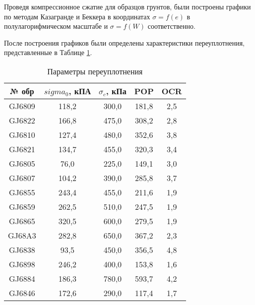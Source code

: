 Проведя компрессионное сжатие для образцов грунтов, были построены 
графики по методам Казагранде и Беккера в координатах $\sigma = f(e)$ 
в полулагорифмическом масштабе и $\sigma = f(W)$ соответственно.

После построения графиков были определены характеристики переуплотнения,
представленные в Таблице \ref{tab:komp}.

\begin{table}[]
  \centering
  \begin{threeparttable}
    \caption{Параметры переуплотнения}\label{tab:komp}
  \begin{tabular}{|c|c|c|c|c|}
  \hline
  № обр  & $sigma_0$, кПА & $\sigma_c$, кПа & POP   & OCR \\ \hline
  GJ6809 & 118,2  & 300,0   & 181,8 & 2,5 \\ \hline
  GJ6822 & 166,8  & 475,0   & 308,2 & 2,8 \\ \hline
  GJ6810 & 127,4  & 480,0   & 352,6 & 3,8 \\ \hline
  GJ6821 & 134,7  & 455,0   & 320,3 & 3,4 \\ \hline
  GJ6805 & 76,0   & 225,0   & 149,1 & 3,0 \\ \hline
  GJ6807 & 104,2  & 390,0   & 285,8 & 3,7 \\ \hline
  GJ6855 & 243,4  & 455,0   & 211,6 & 1,9 \\ \hline
  GJ6859 & 262,5  & 510,0   & 247,5 & 1,9 \\ \hline
  GJ6865 & 320,5  & 600,0   & 279,5 & 1,9 \\ \hline
  GJ68A3 & 282,8  & 650,0   & 367,2 & 2,3 \\ \hline
  GJ6838 & 93,5   & 450,0   & 356,5 & 4,8 \\ \hline
  GJ6898 & 246,2  & 400,0   & 153,8 & 1,6 \\ \hline
  GJ6884 & 186,3  & 780,0   & 593,7 & 4,2 \\ \hline
  GJ6846 & 172,6  & 290,0   & 117,4 & 1,7 \\ \hline
  \end{tabular}
\end{threeparttable}
  \end{table}

